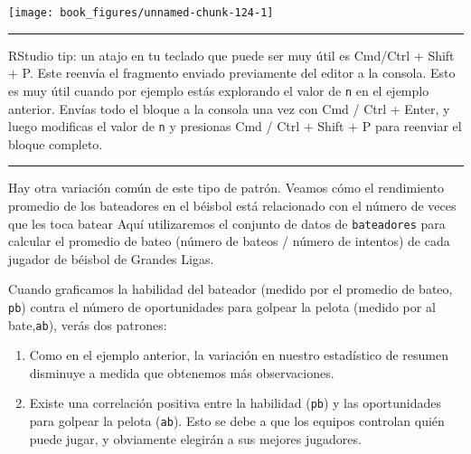 \documentclass[11pt,oneside]{report}
\newenvironment{Shaded}{\begin{snugshade}}{\end{snugshade}}
\newcommand{\DataTypeTok}[1]{\textcolor[rgb]{0.13,0.29,0.53}{#1}}
\newcommand{\DecValTok}[1]{\textcolor[rgb]{0.00,0.00,0.81}{#1}}
\newcommand{\KeywordTok}[1]{\textcolor[rgb]{0.13,0.29,0.53}{\textbf{#1}}}
\newcommand{\NormalTok}[1]{#1}
\newcommand{\OperatorTok}[1]{\textcolor[rgb]{0.81,0.36,0.00}{\textbf{#1}}}
\newcommand{\StringTok}[1]{\textcolor[rgb]{0.31,0.60,0.02}{#1}}
\begin{document}
\begin{Shaded}
\end{Shaded}

\begin{center}\texttt{[image: book\_figures/unnamed-chunk-124-1]} \end{center}

\begin{center}\rule{0.5\linewidth}{0.5pt}\end{center}

RStudio tip: un atajo en tu teclado que puede ser muy útil es Cmd/Ctrl +
Shift + P. Este reenvía el fragmento enviado previamente del editor a la
consola. Esto es muy útil cuando por ejemplo estás explorando el valor
de \texttt{n} en el ejemplo anterior. Envías todo el bloque a la consola
una vez con Cmd / Ctrl + Enter, y luego modificas el valor de \texttt{n}
y presionas Cmd / Ctrl + Shift + P para reenviar el bloque completo.

\begin{center}\rule{0.5\linewidth}{0.5pt}\end{center}

Hay otra variación común de este tipo de patrón. Veamos cómo el
rendimiento promedio de los bateadores en el béisbol está relacionado
con el número de veces que les toca batear Aquí utilizaremos el conjunto
de datos de \texttt{bateadores} para calcular el promedio de bateo
(número de bateos / número de intentos) de cada jugador de béisbol de
Grandes Ligas.

Cuando graficamos la habilidad del bateador (medido por el promedio de
bateo, \texttt{pb}) contra el número de oportunidades para golpear la
pelota (medido por al bate,\texttt{ab}), verás dos patrones:

\begin{enumerate}
\def\labelenumi{\arabic{enumi}.}
\item
  Como en el ejemplo anterior, la variación en nuestro estadístico de
  resumen disminuye a medida que obtenemos más observaciones.
\item
  Existe una correlación positiva entre la habilidad (\texttt{pb}) y las
  oportunidades para golpear la pelota (\texttt{ab}). Esto se debe a que
  los equipos controlan quién puede jugar, y obviamente elegirán a sus
  mejores jugadores.
\end{enumerate}
\end{document}
